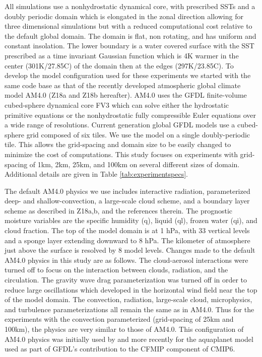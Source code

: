 \documentclass[draft]{agujournal2019}
\begin{document}
All simulations use a nonhydrostatic dynamical core, with prescribed SSTs and a doubly periodic domain which is elongated in the zonal 
direction allowing for three dimensional simulations but with a reduced computational cost relative to the default global domain.  
The domain is flat, non rotating, and has uniform and constant insolation.
The lower boundary is a water covered surface with the SST prescribed as a time invariant Gaussian function 
which is 4K warmer in the center (301K/27.85C) of the domain then 
at the edges (297K/23.85C).  
To develop the model configuration used for these experiments we started with the same code base as that of the 
recently developed atmospheric global climate model AM4.0 \cite{Zhao_etal18a, Zhao_etal18b} (Z18a and Z18b hereafter).
AM4.0 uses the GFDL finite-volume cubed-sphere dynamical core FV3 \cite{Harris_Lin_2013}
which can solve either the hydrostatic primitive equations or the nonhydrostatic fully compressible Euler equations over a wide range of resolutions.   
Current generation global GFDL models use a cubed-sphere grid composed of six tiles.  We use the model on a single doubly-periodic
tile.  This allows the grid-spacing and domain size to be easily changed to minimize the cost of computations.
This study focuses on experiments with grid-spacing of 1km, 2km, 25km, and 100km on several different
sizes of domain.  Additional details are given in Table \ref{tab:experimentspecs}.  

The default AM4.0 physics we use includes interactive radiation, parameterized deep- and shallow-convection, 
a large-scale cloud scheme, and a boundary layer 
scheme as described in Z18a,b, and the references therein.  The prognostic moisture variables are the specific 
humidity (q), liquid (ql),  frozen water (qi), and cloud fraction.  The top of the model domain is at 1 hPa, with 33 vertical 
levels and a sponge layer extending downward to 8 hPa.  The kilometer of atmosphere just above the surface is resolved by 
8 model levels.  Changes made to the default AM4.0 physics in this study are as follows.  The cloud-aerosol 
interactions were turned off to focus on the interaction between clouds, radiation, and the circulation.  The gravity wave drag 
parameterization was turned off 
in order to reduce large oscillations which developed in the horizontal wind field near the top of the model domain.  
The convection, radiation, large-scale cloud, microphysics, and turbulence parameterizations all remain the same 
as in AM4.0.   Thus for the experiments with the convection parameterized (grid-spacing of 25km and 100km), the 
physics are very similar to those of AM4.0.  
This configuration of AM4.0 physics was initially used by  and more recently for the aquaplanet model
used as part of GFDL's contribution to the CFMIP component of CMIP6.  
\end{document}
